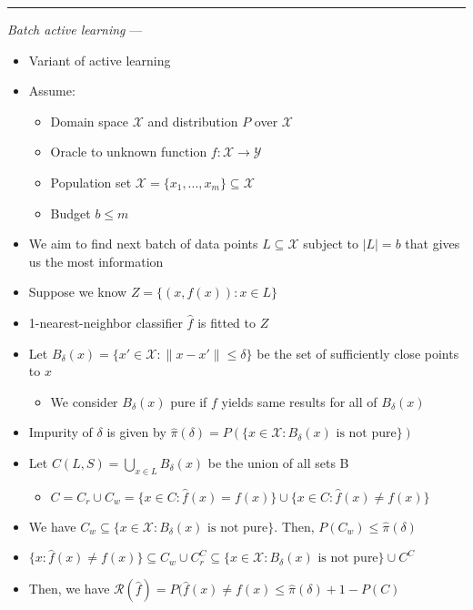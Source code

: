 {\color{lightgray}\hrule height 0.001mm}

\emph{Batch active learning} ---
\begin{itemize}
    \item Variant of active learning
    \item Assume:
    \begin{itemize}
        \item Domain space $\mathcal{X}$ and distribution $P$ over $\mathcal{X}$
        \item Oracle to unknown function $f: \mathcal{X} \rightarrow \mathcal{Y}$
        \item Population set $\mathcal{X} = \{x_1, ..., x_m\} \subseteq \mathcal{X}$
        \item Budget $b \leq m$
    \end{itemize}
    \item We aim to find next batch of data points $L \subseteq \mathcal{X}$ subject to $|L| = b$ that gives us the most information
    \item Suppose we know $Z = \{ (x,f(x)): x \in L \}$
    \item 1-nearest-neighbor classifier $\hat{f}$ is fitted to $Z$
    \item Let $B_\delta(x) = \{ x' \in \mathcal{X}: \| x - x' \| \leq \delta \}$ be the set of sufficiently close points to $x$
    \begin{itemize}
        \item We consider $B_\delta(x)$ pure if $f$ yields same results for all of $B_\delta(x)$
    \end{itemize}
    \item Impurity of $\delta$ is given by $\hat{\pi}(\delta) = P(\{{x \in \mathcal{X}: B_\delta(x) \textrm{ is not pure}}\})$
    \item Let  $C(L,S) = \bigcup_{x \in L} B_\delta(x)$ be the union of all sets B
    \begin{itemize}
        \item $C = C_r \cup C_w = \{x \in C: \hat{f}(x) = f(x)\} \cup \{x \in C: \hat{f}(x) \neq f(x)\}$
    \end{itemize}
    \item We have $C_w \subseteq \{{x \in \mathcal{X}: B_\delta(x) \textrm{ is not pure}}\}$. Then, $P(C_w) \leq \hat{\pi}(\delta)$
    \item $\{x: \hat{f}(x) \neq f(x)\} \subseteq C_w \cup C_r^C \subseteq \{{x \in \mathcal{X}: B_\delta(x) \textrm{ is not pure}}\} \cup C^C$
    \item Then, we have $\mathcal{R}(\hat{f}) = P(\hat{f}(x) \neq f(x) \leq \hat{\pi}(\delta) + 1-P(C)$

\end{itemize}
